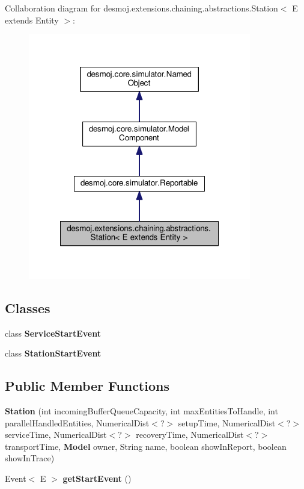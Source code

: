Collaboration diagram for desmoj.\-extensions.\-chaining.\-abstractions.\-Station$<$ E extends Entity $>$\-:
\nopagebreak
\begin{figure}[H]
\begin{center}
\leavevmode
\includegraphics[width=276pt]{classdesmoj_1_1extensions_1_1chaining_1_1abstractions_1_1_station_3_01_e_01extends_01_entity_01_4__coll__graph}
\end{center}
\end{figure}
\subsection*{Classes}
\begin{DoxyCompactItemize}
\item 
class {\bfseries Service\-Start\-Event}
\item 
class {\bfseries Station\-Start\-Event}
\end{DoxyCompactItemize}
\subsection*{Public Member Functions}
\begin{DoxyCompactItemize}
\item 
{\bf Station} (int incoming\-Buffer\-Queue\-Capacity, int max\-Entities\-To\-Handle, int parallel\-Handled\-Entities, Numerical\-Dist$<$?$>$ setup\-Time, Numerical\-Dist$<$?$>$ service\-Time, Numerical\-Dist$<$?$>$ recovery\-Time, Numerical\-Dist$<$?$>$ transport\-Time, {\bf Model} owner, String name, boolean show\-In\-Report, boolean show\-In\-Trace)
\item 
Event$<$ E $>$ {\bf get\-Start\-Event} ()
\end{DoxyCompactItemize}
